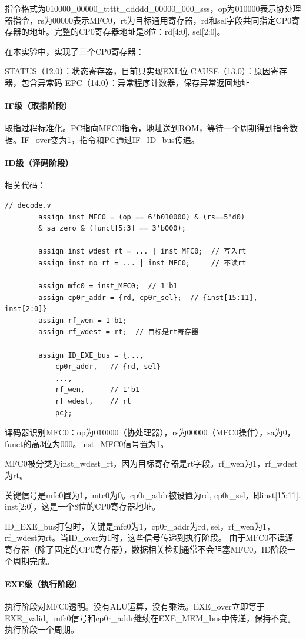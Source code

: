 \documentclass[a4paper]{article}
\begin{document}
	指令格式为010000\_00000\_ttttt\_ddddd\_00000\_000\_sss，op为010000表示协处理器指令，rs为00000表示MFC0，rt为目标通用寄存器，rd和sel字段共同指定CP0寄存器的地址。完整的CP0寄存器地址是8位：{rd[4:0], sel[2:0]}。
	
	在本实验中，实现了三个CP0寄存器：
	
	STATUS（12.0）：状态寄存器，目前只实现EXL位
	CAUSE（13.0）：原因寄存器，包含异常码
	EPC（14.0）：异常程序计数器，保存异常返回地址
	\paragraph{IF级（取指阶段）}
	取指过程标准化。PC指向MFC0指令，地址送到ROM，等待一个周期得到指令数据。IF\_over变为1，指令和PC通过IF\_ID\_bus传递。
	\paragraph{ID级（译码阶段）}
	相关代码：
	\begin{lstlisting}[caption={ID}]
		// decode.v
		assign inst_MFC0 = (op == 6'b010000) & (rs==5'd0)
		& sa_zero & (funct[5:3] == 3'b000);
		
		assign inst_wdest_rt = ... | inst_MFC0;  // 写入rt
		assign inst_no_rt = ... | inst_MFC0;     // 不读rt
		
		assign mfc0 = inst_MFC0;  // 1'b1
		assign cp0r_addr = {rd, cp0r_sel};  // {inst[15:11], inst[2:0]}
		assign rf_wen = 1'b1;
		assign rf_wdest = rt;  // 目标是rt寄存器
		
		assign ID_EXE_bus = {...,
			cp0r_addr,   // {rd, sel}
			...,
			rf_wen,      // 1'b1
			rf_wdest,    // rt
			pc};
	\end{lstlisting}
	
	译码器识别MFC0：op为010000（协处理器），rs为00000（MFC0操作），sa为0，funct的高3位为000。inst\_MFC0信号置为1。
	
	MFC0被分类为inst\_wdest\_rt，因为目标寄存器是rt字段。rf\_wen为1，rf\_wdest为rt。
	
	关键信号是mfc0置为1，mtc0为0。cp0r\_addr被设置为{rd, cp0r\_sel}，即{inst[15:11], inst[2:0]}，这是一个8位的CP0寄存器地址。
	
	ID\_EXE\_bus打包时，关键是mfc0为1，cp0r\_addr为{rd, sel}，rf\_wen为1，rf\_wdest为rt。当ID\_over为1时，这些信号传递到执行阶段。
	由于MFC0不读源寄存器（除了固定的CP0寄存器），数据相关检测通常不会阻塞MFC0。ID阶段一个周期完成。
	\paragraph{EXE级（执行阶段）}
	执行阶段对MFC0透明。没有ALU运算，没有乘法。EXE\_over立即等于EXE\_valid。mfc0信号和cp0r\_addr继续在EXE\_MEM\_bus中传递，保持不变。执行阶段一个周期。
\end{document}
